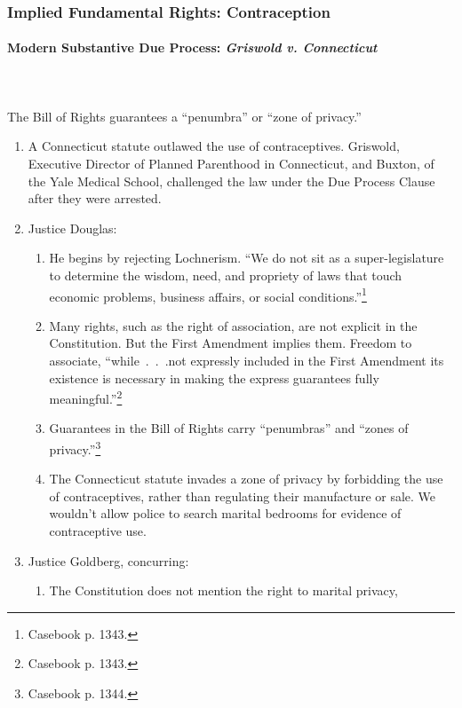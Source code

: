 \subsubsection{Implied Fundamental Rights: Contraception}
 
\paragraph{Modern Substantive Due Process: \emph{Griswold v. Connecticut}}
~\\\\
The Bill of Rights guarantees a ``penumbra'' or ``zone of privacy.''

\begin{enumerate}
    \item A Connecticut statute outlawed the use of contraceptives. Griswold, 
    Executive Director of Planned Parenthood in Connecticut, and Buxton, of 
    the Yale Medical School, challenged the law under the Due Process Clause 
    after they were arrested.
    \item Justice Douglas:
    \begin{enumerate}
        \item He begins by rejecting Lochnerism. ``We do not sit as a 
        super-legislature to determine the wisdom, need, and propriety of laws 
        that touch economic problems, business affairs, or social 
        conditions.''\footnote{Casebook p. 1343.}
        \item Many rights, such as the right of association, are not explicit 
        in the Constitution. But the First Amendment implies them. Freedom to 
        associate, ``while~.~.~.not expressly included in the First Amendment 
        its existence is necessary in making the express guarantees fully 
        meaningful.''\footnote{Casebook p. 1343.}
        \item Guarantees in the Bill of Rights carry ``penumbras'' and ``zones 
        of privacy.''\footnote{Casebook p. 1344.}
        \item The Connecticut statute invades a zone of privacy by forbidding 
        the use of contraceptives, rather than regulating their manufacture or 
        sale. We wouldn't allow police to search marital bedrooms for evidence 
        of contraceptive use.
    \end{enumerate}
    \item Justice Goldberg, concurring:
    \begin{enumerate}
        \item The Constitution does not mention the right to marital privacy, 

\end{enumerate}
\end{enumerate}
